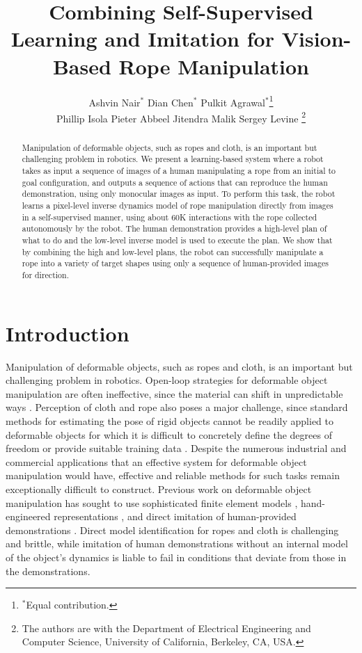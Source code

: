 \documentclass[letterpaper, 10 pt, conference]{ieeeconf}  %
\title{\LARGE \bf
Combining Self-Supervised Learning and Imitation for Vision-Based Rope Manipulation
}
\author{Ashvin Nair$^{*}$ \hspace{5mm} Dian Chen$^{*}$ \hspace{5mm}  Pulkit Agrawal$^{*}$\thanks{$^{*}$Equal contribution.}\\ 
Phillip Isola \hspace{5mm} Pieter Abbeel \hspace{5mm} Jitendra Malik \hspace{5mm} Sergey Levine%
\thanks{The authors are with the Department of Electrical Engineering and Computer Science, University of California, Berkeley, CA, USA.%
}
}
\begin{document}
\maketitle
\thispagestyle{empty}
\pagestyle{empty}


\begin{abstract}
Manipulation of deformable objects, such as ropes and cloth, is an important but challenging problem in robotics.
We present a learning-based system where a robot takes as input a sequence of images of a human manipulating a rope from an initial to goal configuration, and outputs a sequence of actions that can reproduce the human demonstration, using only monocular images as input. To perform this task, the robot learns a pixel-level inverse dynamics model of rope manipulation directly from images in a self-supervised manner, using about 60K interactions with the rope collected autonomously by the robot. The human demonstration provides a high-level plan of what to do and the low-level inverse model is used to execute the plan. We show that by combining the high and low-level plans, the robot can successfully manipulate a rope into a variety of target shapes using only a sequence of human-provided images for direction.

\end{abstract}


\section{Introduction}

Manipulation of deformable objects, such as ropes and cloth, is an important but challenging problem in robotics. Open-loop strategies for deformable object manipulation are often ineffective, since the material can shift in unpredictable ways \cite{hopcroft1991case}. Perception of cloth and rope also poses a major challenge, since standard methods for estimating the pose of rigid objects cannot be readily applied to deformable objects for which it is difficult to concretely define the degrees of freedom or provide suitable training data \cite{miller2011parametrized}. Despite the numerous industrial and commercial applications that an effective system for deformable object manipulation would have, effective and reliable methods for such tasks remain exceptionally difficult to construct. Previous work on deformable object manipulation has sought to use sophisticated finite element models \cite{hopcroft1991case,bell2010flexible}, hand-engineered representations \cite{kuniyoshi1994learning,wakamatsu2006knotting,morita2003knot,maitin2010cloth}, and direct imitation of human-provided demonstrations \cite{mayer2008system,schulman2013warping}. Direct model identification for ropes and cloth is challenging and brittle, while imitation of human demonstrations without an internal model of the object's dynamics is liable to fail in conditions that deviate from those in the demonstrations.
\end{document}
